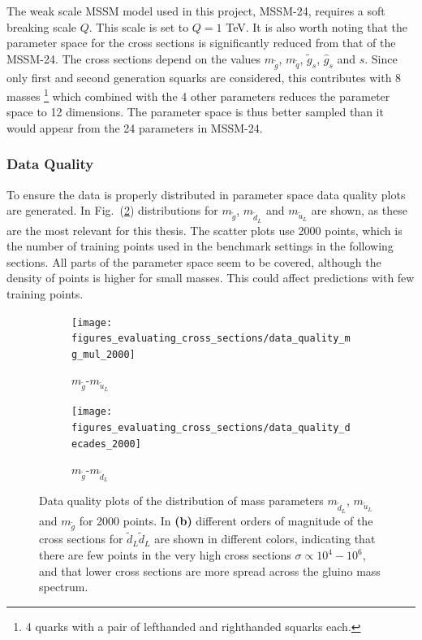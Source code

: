 \documentclass[twoside,english]{uiofysmaster}
\begin{document}
The weak scale MSSM model used in this project, MSSM-24, requires a soft breaking scale $Q$. This scale is set to $Q=1$ TeV. It is also worth noting that the parameter space for the cross sections is significantly reduced from that of the MSSM-24. The cross sections depend on the values $m_{\tilde{g}}$, $m_{\tilde{q}}$, $\tilde{g}_s$, $\hat{g}_s$ and $s$. Since only first and second generation squarks are considered, this contributes with 8 masses \footnote{4 quarks with a pair of lefthanded and righthanded squarks each.} which combined with the 4 other parameters reduces the parameter space to 12 dimensions. The parameter space is thus better sampled than it would appear from the 24 parameters in MSSM-24.

\subsubsection{Data Quality}

To ensure the data is properly distributed in parameter space data quality plots are generated. In Fig.\ (\ref{Fig:: evaluating cross : Data quality}) distributions for $m_{\tilde{g}}$, $m_{\tilde{d}_L}$ and $m_{\tilde{u}_L}$ are shown, as these are the most relevant for this thesis. The scatter plots use 2000 points, which is the number of training points used in the benchmark settings in the following sections. All parts of the parameter space seem to be covered, although the density of points is higher for small masses. This could affect predictions with few training points.

\begin{figure}
    \centering
    \begin{subfigure}[b]{0.4\textwidth}
        \texttt{[image: figures\_evaluating\_cross\_sections/data\_quality\_mg\_mul\_2000]}
        \caption{$m_{\tilde{g}}$-$m_{\tilde{u}_L}$}
    \end{subfigure}
    \begin{subfigure}[b]{0.5\textwidth}
        \texttt{[image: figures\_evaluating\_cross\_sections/data\_quality\_decades\_2000]}
        \caption{$m_{\tilde{g}}$-$m_{\tilde{d}_L}$}
        \label{Fig :: evaluating cross : dq b}
    \end{subfigure}
    \caption{Data quality plots of the distribution of mass parameters $m_{\tilde{d}_L}$, $m_{\tilde{u}_L}$ and $m_{\tilde{g}}$ for 2000 points. In \textbf{(b)} different orders of magnitude of the cross sections for $\tilde{d}_L \tilde{d}_L$ are shown in different colors, indicating that there are few points in the very high cross sections $\sigma \propto 10^{4}-10^{6}$, and that lower cross sections are more spread across the gluino mass spectrum. }
    \label{Fig:: evaluating cross : Data quality}
\end{figure}
\end{document}
